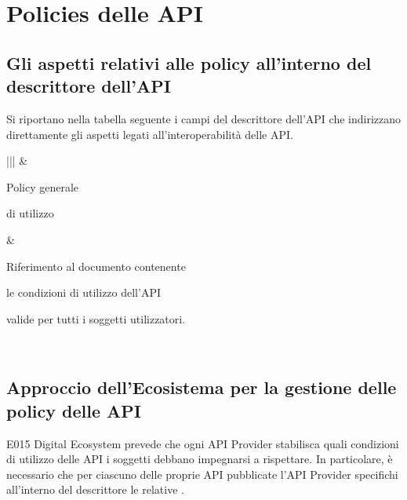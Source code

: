 \documentclass[letterpaper,10pt,italian]{sphinxmanual}
\begin{document}
\section{Policies delle API}
\label{\detokenize{sez28:sezione28}}\label{\detokenize{sez28::doc}}\label{\detokenize{sez28:policies-delle-api}}



\subsection{Gli aspetti relativi alle policy all’interno del descrittore dell’API}
\label{\detokenize{sez28:sezione281}}\label{\detokenize{sez28:gli-aspetti-relativi-alle-policy-allinterno-del-descrittore-dellapi}}
Si riportano nella tabella seguente i campi del descrittore dell’API che indirizzano direttamente gli aspetti legati all’interoperabilità delle API.


\begin{savenotes}\sphinxattablestart
\centering
{}
\label{\detokenize{sez28:id1}}
\sphinxaftercaption
\begin{tabular}[t]{|*{2}{|}}
\hline
{}\relax &\relax \\
\hline
\begin{DUlineblock}{0em}
\item[] Policy generale
\item[] di utilizzo
\end{DUlineblock}
&
\begin{DUlineblock}{0em}
\item[] Riferimento al documento contenente
\item[] le condizioni di utilizzo dell’API
\item[] valide per tutti i soggetti utilizzatori.
\end{DUlineblock}
\\
\hline
\end{tabular}
\par
\sphinxattableend\end{savenotes}


\subsection{Approccio dell’Ecosistema per la gestione delle policy delle API}
\label{\detokenize{sez28:sezione282}}\label{\detokenize{sez28:approccio-dellecosistema-per-la-gestione-delle-policy-delle-api}}
E015 Digital Ecosystem prevede che ogni API Provider stabilisca quali condizioni di utilizzo delle API i soggetti debbano impegnarsi a rispettare.
In particolare, è necessario che per ciascuno delle proprie API pubblicate l’API Provider specifichi all’interno del descrittore le relative .
\end{document}
